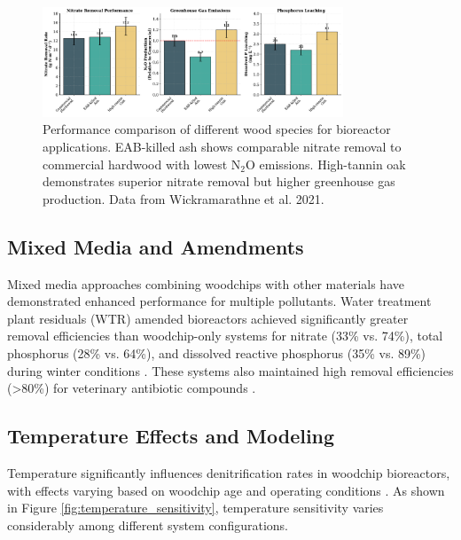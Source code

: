 \documentclass[12pt,a4paper]{article}
\begin{document}
\begin{figure}[ht]
\centering
\includegraphics[width=0.8\textwidth]{fig9_wood_species_comparison_scientific}
\caption{Performance comparison of different wood species for bioreactor applications. EAB-killed ash shows comparable nitrate removal to commercial hardwood with lowest N$_2$O emissions. High-tannin oak demonstrates superior nitrate removal but higher greenhouse gas production. Data from Wickramarathne et al. 2021.}
\label{fig:wood_species_comparison}
\end{figure}

\subsection{Mixed Media and Amendments}

Mixed media approaches combining woodchips with other materials have demonstrated enhanced performance for multiple pollutants. Water treatment plant residuals (WTR) amended bioreactors achieved significantly greater removal efficiencies than woodchip-only systems for nitrate (33\% vs. 74\%), total phosphorus (28\% vs. 64\%), and dissolved reactive phosphorus (35\% vs. 89\%) during winter conditions \citep{RN625}. These systems also maintained high removal efficiencies (>80\%) for veterinary antibiotic compounds \citep{RN625}.

\subsection{Temperature Effects and Modeling}

Temperature significantly influences denitrification rates in woodchip bioreactors, with effects varying based on woodchip age and operating conditions \citep{RN228, RN242}. As shown in Figure \ref{fig:temperature_sensitivity}, temperature sensitivity varies considerably among different system configurations.
\end{document}

